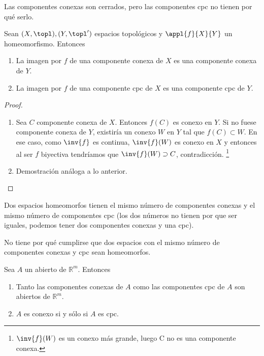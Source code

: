 \documentclass{apuntes}
\begin{document}
\begin{remark} Las componentes conexas son cerrados, pero las componentes cpc no tienen por qué serlo. \end{remark}

\begin{prop} Sean $(X, \topl), (Y, \topl')$ espacios topológicos y $\appl{f}{X}{Y}$ un homeomorfismo. Entonces \begin{enumerate}
	\item La imagen por $f$ de una componente conexa de $X$ es una componente conexa de $Y$.
	\item La imagen por $f$ de una componente cpc de $X$ es una componente cpc de $Y$.
\end{enumerate}
\end{prop}

\begin{proof}
\begin{enumerate}
	\item Sea $C$ componente conexa de $X$. Entonces $f(C)$ es conexo en $Y$. Si no fuese componente conexa de $Y$, existiría un conexo $W$ en $Y$ tal que $f(C) ⊂ W$. En ese caso, como $\inv{f}$ es continua, $\inv{f}(W)$ es conexo en $X$ y entonces al ser $f$ biyectiva tendríamos que $\inv{f}(W) \supset C$, contradicción. \footnote{$\inv{f}(W)$ es un conexo más grande, luego C no es una componente conexa.}
	\item Demostración análoga a lo anterior.
\end{enumerate}
\end{proof}

\begin{corol} Dos espacios homeomorfos tienen el mismo número de componentes conexas y el mismo número de componentes cpc (los dos números no tienen por que ser iguales, podemos tener dos componentes conexas y una cpc).

No tiene por qué cumplirse que dos espacios con el mismo número de componentes conexas y cpc sean homeomorfos.
\end{corol}

\begin{prop} Sea $A$ un abierto de $ℝ^m$. Entonces

\begin{enumerate}
	\item Tanto las componentes conexas de $A$ como las componentes cpc de $A$ son abiertos de $ℝ^m$.
	\item $A$ es conexo si y sólo si $A$ es cpc.
\end{enumerate}
\end{prop}
\end{document}
